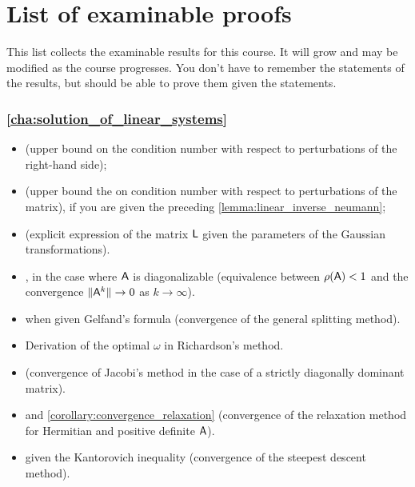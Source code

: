 \chapter*{List of examinable proofs}%
This list collects the examinable results for this course.
It will grow and may be modified as the course progresses.
You don't have to remember the statements of the results,
but should be able to prove them given the statements.

\subsection*{\cref{cha:solution_of_linear_systems}}%

\begin{itemize}
    \item {} (upper bound on the condition number with respect to perturbations of the right-hand side);
    \item {} (upper bound the on condition number with respect to perturbations of the matrix),
        if you are given the preceding \cref{lemma:linear_inverse_neumann};
    \item {} (explicit expression of the matrix $\mathsf L$ given the parameters of the Gaussian transformations).
    \item {},
        in the case where $\mathsf A$ is diagonalizable (equivalence between $\rho(\mathsf A) < 1$ and the convergence $\lVert\mathsf A^k\rVert \to 0$ as $k \to \infty$).

    \item {} when given Gelfand's formula (convergence of the general splitting method).
    \item Derivation of the optimal $\omega$ in Richardson's method.
    \item {} (convergence of Jacobi's method in the case of a strictly diagonally dominant matrix).
    \item {} and \cref{corollary:convergence_relaxation} (convergence of the relaxation method for Hermitian and positive definite $\mathsf A$).
    \item {} given the Kantorovich inequality (convergence of the steepest descent method).
\end{itemize}


